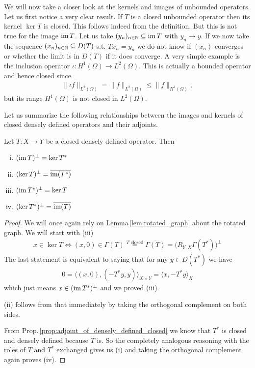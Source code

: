 \documentclass[../main.tex]{subfiles}
\begin{document}
We will now take a closer look at the kernels and images of unbounded operators.
Let us first notice a very clear result. If $T$ is a closed unbounded operator 
then its kernel $\ker T$ is closed. This follows indeed from the definition. 
But this is not true for the image $\operatorname{im} T$. Let us take
$(y_n)_{n \in \mathbb{N}} \subseteq \operatorname{im} T$ with $y_n \rightarrow y$.
If we now take the sequence $(x_n)_{n \in \mathbb{N}} \subseteq D(T)$
s.t. $Tx_n = y_n$ we do not know if $(x_n)$ converges or 
whether the limit is in $D(T)$ if it does converge. 
A very simple example is the inclusion operator
$\iota: H^1(\Omega) \rightarrow L^2(\Omega)$. This is actually a bounded 
operator and hence closed since 
\begin{align*}
    \lVert \iota f \rVert _{L^2(\Omega)} 
    = \lVert f \rVert _{L^2(\Omega)} 
    \leq \lVert f \rVert _{H^1(\Omega)},
\end{align*}
but its range $H^1(\Omega)$ is not closed in $L^2(\Omega)$.

Let us summarize the following relationships between the images and kernels 
of closed densely defined operators and their adjoints.

\begin{proposition}\label{prop:kernel_image_adjoint}
    Let $T: X \rightarrow Y$ be a closed densely defined operator. Then
    \begin{enumerate}[(i)]
        \item $(\operatorname{im} T)^\perp = \ker T^*$
        \item $(\ker T)^\perp = \overline{\operatorname{im}(T^*)}$
        \item $(\operatorname{im} T^*)^\perp = \ker T$
        \item $(\ker T^*)^\perp = \overline{\operatorname{im}(T)}$
    \end{enumerate}
\end{proposition}
\begin{proof}
    We will once again rely on Lemma\,\ref{lem:rotated_graph} about the 
    rotated graph. We will start with (iii)
    \begin{align*}
        x \in \ker T \Leftrightarrow (x,0) \in \Gamma(T) 
        \stackrel{\text{$T$ closed}}{=} \overline{\Gamma(T)} 
        = \big( R_{Y,X}\Gamma(T^*) \big)^\perp 
    \end{align*}
    The last statement is equivalent to saying that for any $y \in D(T^*)$ 
    we have 
    \begin{align*}
        0 = \langle (x,0), (-T^*y,y) \rangle_{X \times Y}
        = \langle x, -T^*y \rangle_X
    \end{align*}
    which just means $x \in (\operatorname{im} T^*)^\perp$ and we proved (iii).

    (ii) follows from that immediately by taking the orthogonal complement 
    on both sides.

    From Prop.\,\ref{prop:adjoint_of_densely_defined_closed} 
    we know that $T^*$ is closed and densely defined because $T$
    is. So the completely analogous reasoning with the roles of $T$ and $T^*$
    exchanged gives us (i) and taking the orthogonal complement again 
    proves (iv).
\end{proof}
\end{document}
